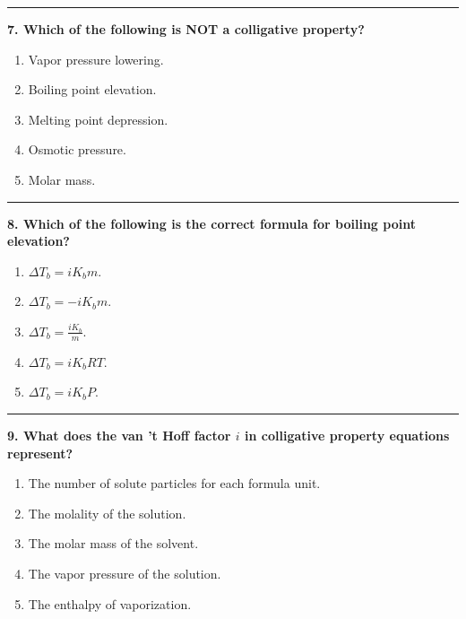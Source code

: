 \documentclass[
  9pt,
]{extbook}
\providecommand{\tightlist}{%
  \setlength{\itemsep}{0pt}\setlength{\parskip}{0pt}}
\theoremstyle{definition}
\theoremstyle{definition}
\theoremstyle{definition}
\theoremstyle{remark}
\begin{document}
\begin{center}\rule{0.5\linewidth}{0.5pt}\end{center}

\textbf{7. Which of the following is NOT a colligative property?}

\begin{enumerate}
\def\labelenumi{\alph{enumi}.}
\tightlist
\item
  Vapor pressure lowering.
\item
  Boiling point elevation.
\item
  Melting point depression.
\item
  Osmotic pressure.
\item
  Molar mass.
\end{enumerate}

\begin{center}\rule{0.5\linewidth}{0.5pt}\end{center}

\textbf{8. Which of the following is the correct formula for boiling point elevation?}

\begin{enumerate}
\def\labelenumi{\alph{enumi}.}
\tightlist
\item
  \(\Delta T_b = iK_b m\).
\item
  \(\Delta T_b = -iK_b m\).
\item
  \(\Delta T_b = \frac{iK_b}{m}\).
\item
  \(\Delta T_b = iK_b RT\).
\item
  \(\Delta T_b = iK_b P\).
\end{enumerate}

\begin{center}\rule{0.5\linewidth}{0.5pt}\end{center}

\textbf{9. What does the van 't Hoff factor \(i\) in colligative property equations represent?}

\begin{enumerate}
\def\labelenumi{\alph{enumi}.}
\tightlist
\item
  The number of solute particles for each formula unit.
\item
  The molality of the solution.
\item
  The molar mass of the solvent.
\item
  The vapor pressure of the solution.
\item
  The enthalpy of vaporization.
\end{enumerate}
\end{document}
